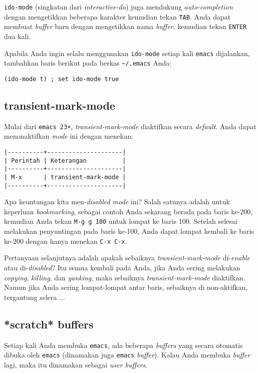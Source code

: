 \documentclass{article}
\begin{document}
\verb=ido-mode= (singkatan dari \emph{interactive-do}) juga mendukung 
\emph{auto-completion} dengan mengetikkan beberapa karakter kemudian tekan 
\verb=TAB=. Anda dapat membuat \emph{buffer} baru dengan mengetikkan 
nama \emph{buffer}, kemudian tekan \verb=ENTER= dua kali.

Apabila Anda ingin selalu menggunakan \verb=ido-mode= setiap kali \verb=emacs= 
dijalankan, tambahkan baris berikut pada berkas \verb=~/.emacs= Anda:

\begin{verbatim}
(ido-mode t) ; set ido-mode true
\end{verbatim}

\subsection{transient-mark-mode}
Mulai dari \verb=emacs 23+=, \emph{transient-mark-mode} diaktifkan secara 
\emph{default}. Anda dapat menonaktifkan \emph{mode} ini dengan menekan:

\begin{verbatim}
|----------+---------------------|
| Perintah | Keterangan          |
|----------+---------------------|
| M-x      | transient-mark-mode |
|----------+---------------------|
\end{verbatim}

Apa keuntungan kita men-\emph{disabled mode} ini? Salah satunya adalah untuk
keperluan \emph{bookmarking}, sebagai contoh Anda sekarang berada pada baris
ke-200, kemudian Anda tekan \verb=M-g g 100= untuk lompat ke baris 100. 
Setelah selesai melakukan penyuntingan pada baris ke-100, Anda dapat lompat
kembali ke baris ke-200 dengan hanya menekan \verb=C-x C-x=.

Pertanyaan selanjutnya adalah apakah sebaiknya \emph{transient-mark-mode}
di-\emph{enable} atau di-\emph{disabled}? Itu semua kembali pada Anda, jika
Anda sering melakukan \emph{copying}, \emph{killing}, dan \emph{yanking}, maka
sebaiknya \emph{transient-mark-mode} diaktifkan. Namun jika Anda sering 
lompat-lompat antar baris, sebaiknya di non-aktifkan, tergantung selera ... 

\subsection{*scratch* buffers}
Setiap kali Anda membuka \verb=emacs=, ada beberapa \emph{buffers} yang secara
otomatis dibuka oleh \verb=emacs= (dinamakan juga \verb=emacs= \emph{buffer}).
Kalau Anda membuka \emph{buffer} lagi, maka itu dinamakan sebagai 
\emph{user buffers}.
\end{document}
